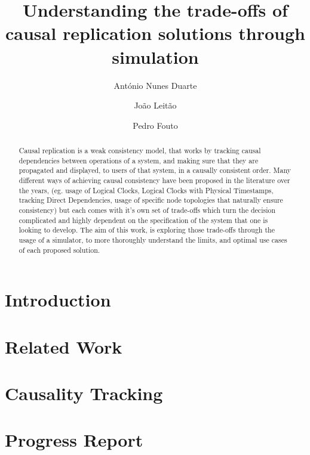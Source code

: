 \documentclass[runningheads]{llncs}
\begin{document}
%
\title{Understanding the trade-offs of causal replication solutions through simulation}
%
%
\author{António Nunes Duarte \and
João Leitão \and
Pedro Fouto}
%
%
%
\maketitle              %
%
\begin{abstract}
Causal replication is a weak consistency model, that works by 
tracking causal dependencies between operations of a system, and making sure that they are propagated
and displayed, to users of that system, in a causally consistent order.
Many different ways of achieving causal consistency have been proposed in the literature
over the years, (eg. usage of Logical Clocks\cite{baquero2016logical}, 
	Logical Clocks with Physical Timestamps\cite{roohitavaf2017causalspartan,du2014gentlerain}, tracking Direct Dependencies\cite{lloyd2011don}, 
usage of specific node topologies that naturally ensure consistency\cite{van2020intrinsic})
but each comes with it's own set of trade-offs which turn the decision complicated 
and	highly dependent on the specification of the system that one is looking to develop. The aim of this work, is 
exploring those trade-offs through the usage of a simulator, to more thoroughly understand the limits,
and optimal use cases of each proposed solution.

\end{abstract}

\section{Introduction}

\section{Related Work}

\section{Causality Tracking}

\section{Progress Report}

%
%
%
% 
% 
%



\end{document}
